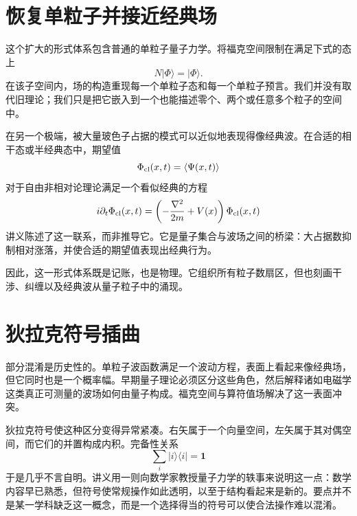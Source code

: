 \section{恢复单粒子并接近经典场}

这个扩大的形式体系包含普通的单粒子量子力学。将福克空间限制在满足下式的态上
\begin{equation}
N|\Phi\rangle=|\Phi\rangle.
\end{equation}
在该子空间内，场的构造重现每一个单粒子态和每一个单粒子预言。我们并没有取代旧理论；我们只是把它嵌入到一个也能描述零个、两个或任意多个粒子的空间中。

在另一个极端，被大量玻色子占据的模式可以近似地表现得像经典波。在合适的相干态或半经典态中，期望值
\begin{equation}
\Phi_{\rm cl}(x,t)=\langle\Psi(x,t)\rangle
\end{equation}
对于自由非相对论理论满足一个看似经典的方程
\begin{equation}
i\partial_t\Phi_{\rm cl}(x,t)
=\left(-\frac{\nabla^2}{2m}+V(x)\right)\Phi_{\rm cl}(x,t)
\label{eq:l07-classical-schrodinger}
\end{equation}
讲义陈述了这一联系，而非推导它。它是量子集合与波场之间的桥梁：大占据数抑制相对涨落，并使合适的期望值表现出经典行为。

因此，这一形式体系既是记账，也是物理。它组织所有粒子数扇区，但也刻画干涉、纠缠以及经典波从量子粒子中的涌现。

\begin{classroomqa}
\end{classroomqa}

\section{狄拉克符号插曲}

部分混淆是历史性的。单粒子波函数满足一个波动方程，表面上看起来像经典场，但它同时也是一个概率幅。早期量子理论必须区分这些角色，然后解释诸如电磁学这类真正可测量的波场如何由量子构成。福克空间与算符值场解决了这一表面冲突。

狄拉克符号使这种区分变得异常紧凑。右矢属于一个向量空间，左矢属于其对偶空间，而它们的并置构成内积。完备性关系
\begin{equation}
\sum_i|i\rangle\langle i|=\mathbf 1
\end{equation}
于是几乎不言自明。讲义用一则向数学家教授量子力学的轶事来说明这一点：数学内容早已熟悉，但符号使常规操作如此透明，以至于结构看起来是新的。要点并不是某一学科缺乏这一概念，而是一个选择得当的符号可以使合法操作难以混淆。

